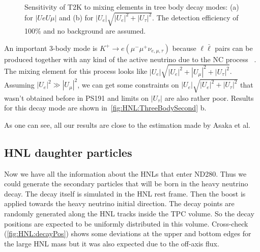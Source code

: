 \documentclass[../main.tex]{subfiles}
\begin{document}
\begin{figure}[!ht]
    \begin{minipage}[!ht]{0.49\linewidth}
    \end{minipage}
    \hfill
    \begin{minipage}[!ht]{0.49\linewidth}
    \end{minipage}
    \caption{Sensitivity of T2K to mixing elements in tree body decay modes: (a) for $\left|UeU\mu\right|$ and (b) for $\left|U_{e}\right|\sqrt{\left|U_{e}\right|^2+\left|U_{\tau}\right|^2}$. The detection efficiency of 100\% and no background are assumed.}
    \label{fig:HNL:ThreeBodySecond}
\end{figure}

An important 3-body mode is $K^+\rightarrow e(\mu^-\mu^+\nu_{e,\mu,\tau})$ because $\ell\bar{\ell}$ pairs can be produced together with any kind of the active neutrino due to  the NC process ~\cite{Johnson1997}. The mixing element for this process looks like $\left|U_{e}\right|\sqrt{\left|U_{e}\right|^2+\left|U_{\mu}\right|^2+\left|U_{\tau}\right|^2}$. Assuming $\left|U_e\right|^2 \gg\left|U_{\mu}\right|^2$, we can get some constraints on $\left|U_{e}\right|\sqrt{\left|U_{e}\right|^2+\left|U_{\tau}\right|^2}$ that wasn't obtained before in PS191 and limits on $\left|U_{\tau}\right|$ are also rather poor. Results for this decay mode are shown in~\autoref{fig:HNL:ThreeBodySecond} b.

As one can see, all our results are close to the estimation made by Asaka et al.

\subsection{HNL daughter particles}
Now we have all the information about the HNLs that enter ND280. Thus we could generate the secondary particles that will be born in the heavy neutrino decay. The decay itself is simulated in the HNL rest frame. Then the boost is applied towards the heavy neutrino initial direction. The decay points are randomly generated along the  HNL tracks inside the TPC volume. So the decay positions are expected to be uniformly distributed in this volume. Cross-check (\autoref{fig:HNL:decayPos}) shows some deviations at the upper and bottom edges for the large HNL mass but it was also expected due to the off-axis flux.
\end{document}
